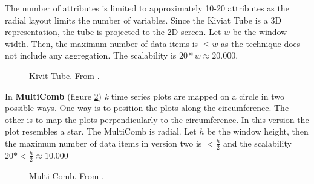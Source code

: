 \par
The number of attributes is limited to approximately 10-20 attributes as the radial layout limits the number of variables. Since the Kiviat Tube is a 3D representation, the tube is projected to the 2D screen. Let $w$ be the window width. Then, the maximum number of data items is $\leq w$ as the technique does not include any aggregation. The scalability is $20*w\approx 20.000$.
\begin{figure}[H]
    \centering
    \caption[Kiviat Tube]{Kivit Tube. From  \cite{Aigner2011}.}
    \label{fig:kiviattube}
\end{figure}
\par
In \textbf{MultiComb} (figure \ref{fig:multicomb}) \textit{k} time series plots are mapped on a circle in two possible ways. One way is to position the plots along the circumference. The other is to map the plots perpendicularly to the circumference. In this version the plot resembles a star.  The MultiComb is radial. Let $h$ be the window height, then the maximum number of data items in version two is $< \frac{h}{2}$ and the scalability $20*< \frac{h}{2} \approx 10.000$
\begin{figure}[H]
    \centering
    \caption[Multi Comb]{Multi Comb. From  \cite{Luo2012}.}
    \label{fig:multicomb}
\end{figure}
